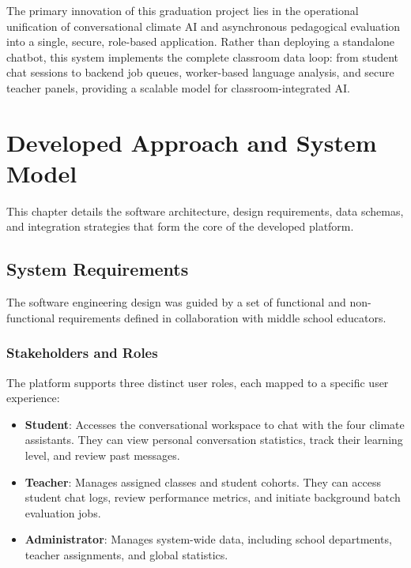 \documentclass[12pt,a4paper,oneside]{report}
\begin{document}
    The primary innovation of this graduation project lies in the operational unification of conversational climate AI and asynchronous pedagogical evaluation into a single, secure, role-based application. Rather than deploying a standalone chatbot, this system implements the complete classroom data loop: from student chat sessions to backend job queues, worker-based language analysis, and secure teacher panels, providing a scalable model for classroom-integrated AI.

    \chapter{Developed Approach and System Model}
    \label{ch:approach}

    This chapter details the software architecture, design requirements, data schemas, and integration strategies that form the core of the developed platform.

    \section{System Requirements}
    The software engineering design was guided by a set of functional and non-functional requirements defined in collaboration with middle school educators.

    \subsection{Stakeholders and Roles}
    The platform supports three distinct user roles, each mapped to a specific user experience:
    \begin{itemize}
        \item \textbf{Student}: Accesses the conversational workspace to chat with the four climate assistants. They can view personal conversation statistics, track their learning level, and review past messages.
        \item \textbf{Teacher}: Manages assigned classes and student cohorts. They can access student chat logs, review performance metrics, and initiate background batch evaluation jobs.
        \item \textbf{Administrator}: Manages system-wide data, including school departments, teacher assignments, and global statistics.
    \end{itemize}
\end{document}
